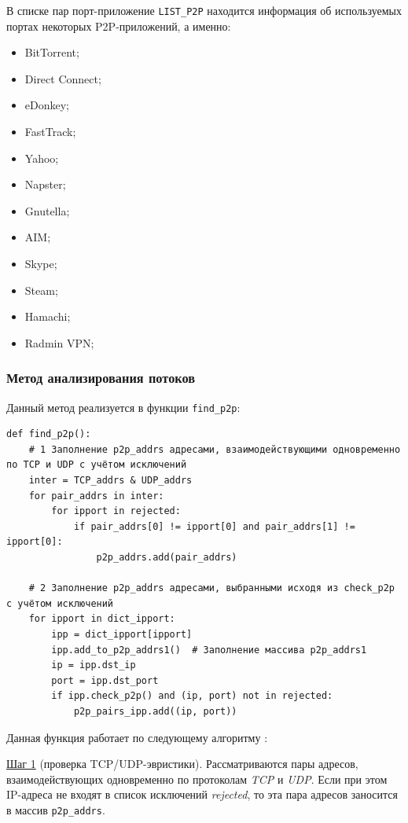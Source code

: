 \documentclass[bachelor, och, coursework]{SCWorks}
\begin{document}
В списке пар порт-приложение \texttt{LIST_P2P} находится информация об используемых портах некоторых P2P-приложений, а именно:

\begin{itemize}
    \item BitTorrent;
    \item Direct Connect;
    \item eDonkey;
    \item FastTrack;
    \item Yahoo;
    \item Napster;
    \item Gnutella;
    \item AIM;
    \item Skype;
    \item Steam;
    \item Hamachi;
    \item Radmin VPN;
\end{itemize}

\subsubsection{Метод анализирования потоков}
Данный метод реализуется в функции \texttt{find_p2p}:

\begin{verbatim}
def find_p2p():
    # 1 Заполнение p2p_addrs адресами, взаимодействующими одновременно по TCP и UDP с учётом исключений
    inter = TCP_addrs & UDP_addrs
    for pair_addrs in inter:
        for ipport in rejected:
            if pair_addrs[0] != ipport[0] and pair_addrs[1] != ipport[0]:
                p2p_addrs.add(pair_addrs)

    # 2 Заполнение p2p_addrs адресами, выбранными исходя из check_p2p с учётом исключений
    for ipport in dict_ipport:
        ipp = dict_ipport[ipport]
        ipp.add_to_p2p_addrs1()  # Заполнение массива p2p_addrs1
        ip = ipp.dst_ip
        port = ipp.dst_port
        if ipp.check_p2p() and (ip, port) not in rejected:
            p2p_pairs_ipp.add((ip, port))
\end{verbatim}

Данная функция работает по следующему алгоритму \cite{algorithm}:

\underline{Шаг 1} (проверка TCP/UDP-эвристики). 
Рассматриваются пары адресов, взаимодействующих одновременно по протоколам \textit{TCP} и \textit{UDP}. 
Если при этом IP-адреса не входят в список исключений \textit{rejected}, то эта пара адресов заносится в массив \texttt{p2p_addrs}.
\end{document}
